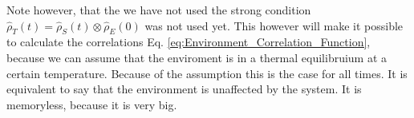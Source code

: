 Note however, that the we have not used the strong condition $\hat{\rho}_T(t) = \hat{\rho}_S(t) \otimes \hat{\rho}_E(0)$ was not used yet.
This however will make it possible to calculate the correlations Eq. \eqref{eq:Environment_Correlation_Function}, because we can assume that the enviroment is in a thermal equilibruium at a certain temperature.
Because of the assumption this is the case for all times.
It is equivalent to say that the environment is unaffected by the system. It is memoryless, because it is very big.